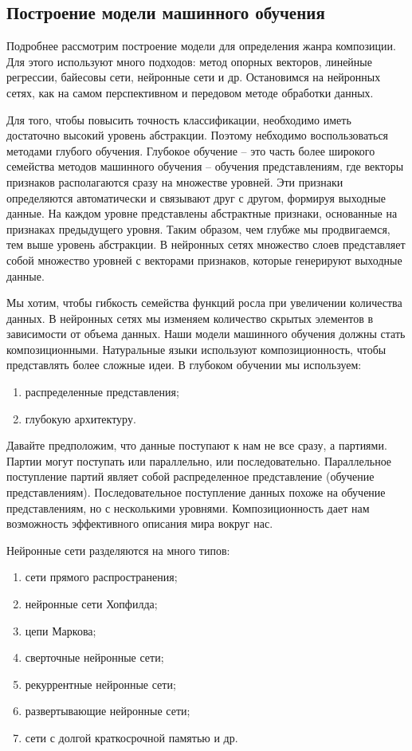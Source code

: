 \subsection{Построение модели машинного обучения}
\label{sec:design:network}

Подробнее рассмотрим построение модели для определения жанра композиции. Для этого используют много подходов: метод опорных векторов, линейные регрессии, байесовы сети, нейронные сети и др. Остановимся на нейронных сетях, как на самом перспективном и передовом методе обработки данных.

Для того, чтобы повысить точность классификации, необходимо иметь достаточно высокий уровень абстракции. Поэтому небходимо воспользоваться методами глубого обучения. Глубокое обучение -- это часть более широкого семейства методов машинного обучения -- обучения представлениям, где векторы признаков располагаются сразу на множестве уровней. Эти признаки определяются автоматически и связывают друг с другом, формируя выходные данные. На каждом уровне представлены абстрактные признаки, основанные на признаках предыдущего уровня. Таким образом, чем глубже мы продвигаемся, тем выше уровень абстракции. В нейронных сетях множество слоев представляет собой множество уровней с векторами признаков, которые генерируют выходные данные.

Мы хотим, чтобы гибкость семейства функций росла при увеличении количества данных. В нейронных сетях мы изменяем количество скрытых элементов в зависимости от объема данных. Наши модели машинного обучения должны стать композиционными. Натуральные языки используют композиционность, чтобы представлять более сложные идеи. В глубоком обучении мы используем:
\begin{enumerate}
  \item распределенные представления;
  \item глубокую архитектуру.
\end{enumerate}

Давайте предположим, что данные поступают к нам не все сразу, а партиями. Партии могут поступать или параллельно, или последовательно. Параллельное поступление партий являет собой распределенное представление (обучение представлениям). Последовательное поступление данных похоже на обучение представлениям, но с несколькими уровнями. Композиционность дает нам возможность эффективного описания мира вокруг нас.

Нейронные сети разделяются на много типов:
\begin{enumerate}
  \item сети прямого распространения;
  \item нейронные сети Хопфилда;
  \item цепи Маркова;
  \item сверточные нейронные сети;
  \item рекуррентные нейронные сети;
  \item развертывающие нейронные сети;
  \item сети с долгой краткосрочной памятью и др.
\end{enumerate}

